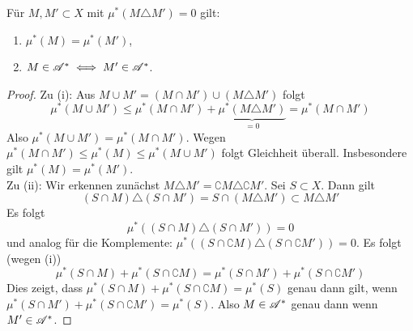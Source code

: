\begin{lemma}
Für $M, M' \subset X$ mit $\mu^*(M \triangle M') =0$ gilt:
\begin{enumerate}[label=(\roman*),topsep=3pt, itemsep=0pt]
	\item $\mu^*(M) = \mu^*(M')$,
	\item $M \in \AA^* \iff M' \in \AA^*$.
\end{enumerate}
\begin{proof}
Zu (i): Aus $M \cup M' = (M \cap M') \cup (M \triangle M')$ folgt
$$
\mu^*(M \cup M' ) \leq \mu^*(M \cap M') + \underbrace{\mu^* (M \triangle M')}_{=0}=\mu^*(M\cap M')
$$ 
Also $\mu^*(M\cup M') = \mu^*(M\cap M')$. Wegen $\mu^*(M\cap M') \leq \mu^*(M) \leq \mu^*(M \cup M')$ folgt Gleichheit überall. Insbesondere gilt $\mu^*(M)=\mu^*(M')$.\\
Zu (ii): Wir erkennen zunächst $M \triangle M' = \complement M \triangle \complement M'$. Sei $S \subset X$. Dann gilt
$$
(S\cap M) \triangle (S \cap M') = S\cap (M \triangle M') \subset M \triangle M'
$$
Es folgt
$$\mu^*((S\cap M)\triangle (S \cap M'))=0$$
und analog für die Komplemente: $\mu^*((S\cap \complement M)\triangle (S \cap \complement M'))=0$.
Es folgt (wegen (i))
$$
\mu^*(S\cap M) + \mu^*(S\cap \complement M) =\mu^*(S \cap M') + \mu^*(S \cap \complement M')
$$
Dies zeigt, dass $\mu^*(S\cap M) + \mu^*(S\cap \complement M) = \mu^*(S)$ genau dann gilt, wenn $\mu^*(S \cap M') + \mu^*(S \cap \complement M')=\mu^*(S)$. Also $M \in \AA^*$ genau dann wenn $M'\in \AA^*$.
\end{proof}
\end{lemma}


%

